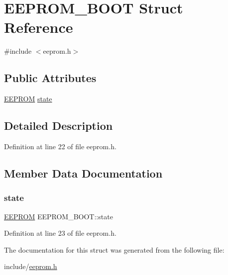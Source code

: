 \hypertarget{structEEPROM__BOOT}{}\section{E\+E\+P\+R\+O\+M\+\_\+\+B\+O\+OT Struct Reference}
\label{structEEPROM__BOOT}


{\ttfamily \#include $<$eeprom.\+h$>$}

\subsection*{Public Attributes}
\begin{DoxyCompactItemize}
\item 
\mbox{\hyperlink{structEEPROM}{E\+E\+P\+R\+OM}} \mbox{\hyperlink{structEEPROM__BOOT_abc73767e50328512a6c381f42437871e}{state}}
\end{DoxyCompactItemize}


\subsection{Detailed Description}


Definition at line 22 of file eeprom.\+h.



\subsection{Member Data Documentation}
\mbox{\label{structEEPROM__BOOT_abc73767e50328512a6c381f42437871e}} 
\subsubsection{\texorpdfstring{state}{state}}
{\footnotesize\ttfamily \mbox{\hyperlink{structEEPROM}{E\+E\+P\+R\+OM}} E\+E\+P\+R\+O\+M\+\_\+\+B\+O\+O\+T\+::state}



Definition at line 23 of file eeprom.\+h.



The documentation for this struct was generated from the following file\+:\begin{DoxyCompactItemize}
\item 
include/\mbox{\hyperlink{eeprom_8h}{eeprom.\+h}}\end{DoxyCompactItemize}
